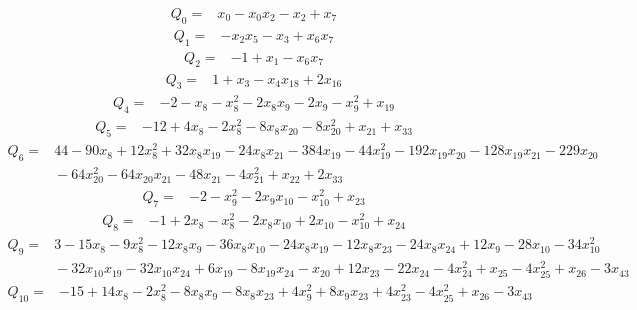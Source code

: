\documentclass[11pt]{article}
\theoremstyle{definition}\newtheorem{definition}[theorem]{Definition}
\begin{document}
{\footnotesize
\begin{align*}
 Q_{0}={}&x_{0} -x_{0}x_{2} -x_{2} +x_{7}
\end{align*}
\begin{align*}
 Q_{1}={}&-x_{2}x_{5} -x_{3} +x_{6}x_{7}
\end{align*}
\begin{align*}
 Q_{2}={}&-1 +x_{1} -x_{6}x_{7}
\end{align*}
\begin{align*}
 Q_{3}={}&1 +x_{3} -x_{4}x_{18} +2x_{16}
\end{align*}
\begin{align*}
 Q_{4}={}&-2 -x_{8} -x_{8}^{2} -2x_{8}x_{9} -2x_{9} -x_{9}^{2} +x_{19}
\end{align*}
\begin{align*}
 Q_{5}={}&-12 +4x_{8} -2x_{8}^{2} -8x_{8}x_{20} -8x_{20}^{2} +x_{21} +x_{33}
\end{align*}
\begin{align*}
 Q_{6}={}&44 -90x_{8} +12x_{8}^{2} +32x_{8}x_{19} -24x_{8}x_{21} -384x_{19} -44x_{19}^{2} -192x_{19}x_{20} -128x_{19}x_{21} -229x_{20}\\
 &{}-64x_{20}^{2} -64x_{20}x_{21} -48x_{21} -4x_{21}^{2} +x_{22} +2x_{33}
\end{align*}
\begin{align*}
 Q_{7}={}&-2 -x_{9}^{2} -2x_{9}x_{10} -x_{10}^{2} +x_{23}
\end{align*}
\begin{align*}
 Q_{8}={}&-1 +2x_{8} -x_{8}^{2} -2x_{8}x_{10} +2x_{10} -x_{10}^{2} +x_{24}
\end{align*}
\begin{align*}
 Q_{9}={}&3 -15x_{8} -9x_{8}^{2} -12x_{8}x_{9} -36x_{8}x_{10} -24x_{8}x_{19} -12x_{8}x_{23} -24x_{8}x_{24} +12x_{9} -28x_{10} -34x_{10}^{2}\\
 &{}-32x_{10}x_{19} -32x_{10}x_{24} +6x_{19} -8x_{19}x_{24} -x_{20} +12x_{23} -22x_{24} -4x_{24}^{2} +x_{25} -4x_{25}^{2} +x_{26} -3x_{43}
\end{align*}
\begin{align*}
 Q_{10}={}&-15 +14x_{8} -2x_{8}^{2} -8x_{8}x_{9} -8x_{8}x_{23} +4x_{9}^{2} +8x_{9}x_{23} +4x_{23}^{2} -4x_{25}^{2} +x_{26} -3x_{43}

\end{align*}}
\end{document}
